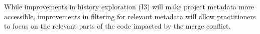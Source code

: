While improvements in history exploration (I3) will make project metadata more accessible, improvements in filtering for relevant metadata will allow practitioners to focus on the relevant parts of the code impacted by the merge conflict.

%
%
%

